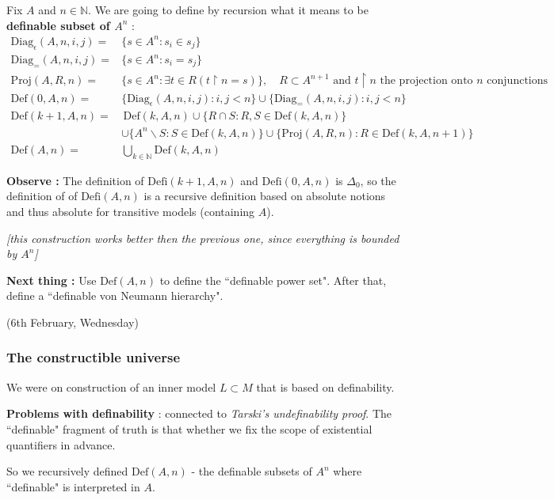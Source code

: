 \documentclass[12pt,a4paper]{article}
\begin{document}
 Fix $A$ and $n\in \mathbb{N}$. We are going to define by recursion what it means to be \textbf{definable subset of $A^n$} :
\begin{align*}
\text{Diag}_{\epsilon}(A, n, i,j) = &\{ s\in A^n : s_i \in s_j \}\\
\text{Diag}_{=}(A, n, i,j) = &\{ s\in A^n : s_i = s_j \}\\
\text{Proj}(A, R,n) = &\{ s\in A^n : \exists t\in R (t \upharpoonright n = s) \}, \quad R\subset A^{n+1} \text{ and } t \upharpoonright n \text{ the projection onto } n \text{ conjunctions}\\
\text{Def}(0, A, n) = &\{ \text{Diag}_{\epsilon}(A, n, i,j) : i,j < n\} \cup \{\text{Diag}_{=}(A, n, i,j) : i,j<n \} \\
\text{Def}(k+1, A, n) = & \,\text{Def}(k, A, n) \cup \{R\cap S : R,S\in \text{Def}(k, A, n)\} \\
&\cup \{ A^n \backslash S : S\in \text{Def}(k, A, n) \} \cup \{ \text{Proj}(A, R,n) : R\in \text{Def}(k, A, n+1) \} \\
\text{Def}(A,n) = &\bigcup_{k\in \mathbb{N}} \text{Def}(k, A, n)
\end{align*}
\s

\textbf{Observe :} The definition of $\text{Defi}(k+1, A,n)$ and $\text{Defi}(0, A,n)$ is $\Delta_0$, so the definition of of $\text{Defi}(A,n)$ is a recursive definition based on absolute notions and thus absolute for transitive models (containing $A$).

\emph{[this construction works better then the previous one, since everything is bounded by $A^n$]}
\s

\textbf{Next thing :} Use $\text{Def}(A, n)$ to define the ``definable power set". After that, define a ``definable von Neumann hierarchy".
\s

\newday

(6th February, Wednesday)
\s

\subsubsection*{The constructible universe}

We were on construction of an inner model $L\subset M$ that is based on definability.

\textbf{Problems with definability} : connected to \emph{Tarski's undefinability proof}. The ``definable" fragment of truth is that whether we fix the scope of existential quantifiers in advance. 

\quad So we recursively defined $\text{Def}(A, n)$ - the definable subsets of $A^n$ where ``definable" is interpreted in $A$.
\s
\end{document}
